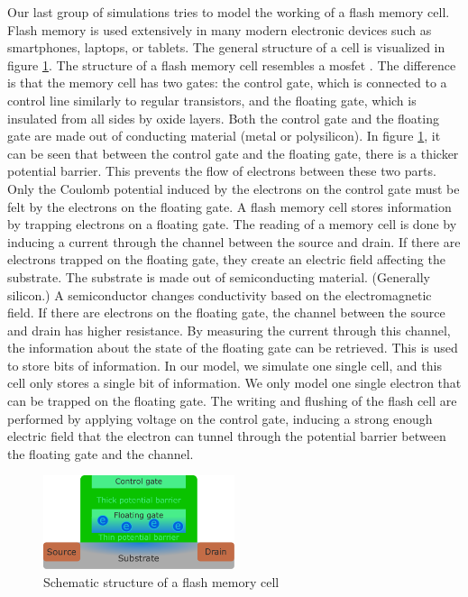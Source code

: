 Our last group of simulations tries to model the working of a flash memory cell.
Flash memory is used extensively in many modern electronic devices such as smartphones, laptops, or tablets.
The general structure of a cell is visualized in figure \ref{fig:flash_memory}.
The structure of a flash memory cell resembles a \acrfull{mosfet} \cite{Korec2011}.
The difference is that the memory cell has two gates: the control gate, which is connected to a control line similarly to regular transistors, and the floating gate, which is insulated from all sides by oxide layers.
Both the control gate and the floating gate are made out of conducting material (metal or polysilicon).
In figure \ref{fig:flash_memory}, it can be seen that between the control gate and the floating gate, there is a thicker potential barrier.
This prevents the flow of electrons between these two parts.
Only the Coulomb potential induced by the electrons on the control gate must be felt by the electrons on the floating gate.
A flash memory cell stores information by trapping electrons on a floating gate.
The reading of a memory cell is done by inducing a current through the channel between the source and drain.
If there are electrons trapped on the floating gate, they create an electric field affecting the substrate.
The substrate is made out of semiconducting material. (Generally silicon.)
A semiconductor changes conductivity based on the electromagnetic field.
If there are electrons on the floating gate, the channel between the source and drain has higher resistance.
By measuring the current through this channel, the information about the state of the floating gate can be retrieved.
This is used to store bits of information.
In our model, we simulate one single cell, and this cell only stores a single bit of information.
We only model one single electron that can be trapped on the floating gate.
The writing and flushing of the flash cell are performed by applying voltage on the control gate, inducing a strong enough electric field that the electron can tunnel through the potential barrier between the floating gate and the channel.
\begin{figure}[hbt!]
	\centering
	\includegraphics[width=0.5\textwidth]{figures/flash_memory.pdf}
	\caption{Schematic structure of a flash memory cell}
	\label{fig:flash_memory}
\end{figure}
